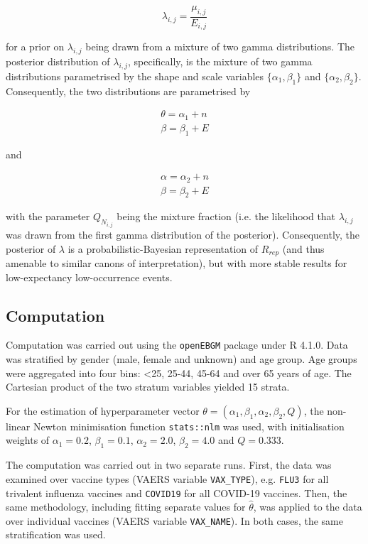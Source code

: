 \documentclass[preprints,communication,submit,oneauthor,pdftex]{Definitions/mdpi}
\begin{document}
$$ \lambda_{i,j} = \frac{\mu_{i,j}}{E_{i,j}}$$

\noindent for a prior on $\lambda_{i,j}$ being drawn from a mixture of two gamma distributions. The posterior distribution of $\lambda_{i,j}$, specifically, is the mixture of two gamma distributions parametrised by the shape and scale variables $\{\alpha_1, \beta_1\}$ and $\{\alpha_2, \beta_2\}$. Consequently, the two distributions are parametrised by

\begin{align*}
	\theta = \alpha_1 + n \\
	\beta = \beta_1 + E
\end{align*}

\noindent and 

\begin{align*}
	\alpha = \alpha_2 + n \\
	\beta = \beta_2 + E
\end{align*}

\noindent with the parameter $Q_{N_{i,j}}$ being the mixture fraction (i.e. the likelihood that $\lambda_{i,j}$ was drawn from the first gamma distribution of the posterior). Consequently, the posterior of $\lambda$ is a probabilistic-Bayesian representation of $R_{rep}$ (and thus amenable to similar canons of interpretation), but with more stable results for low-expectancy low-occurrence events.


\subsection{Computation} %
\label{sub:computation}

Computation was carried out using the \texttt{openEBGM}\cite{canida2017openebgm} package under R 4.1.0.\cite{rstats} Data was stratified by gender (male, female and unknown) and age group. Age groups were aggregated into four bins: <25, 25-44, 45-64 and over 65 years of age. The Cartesian product of the two stratum variables yielded 15 strata.

For the estimation of hyperparameter vector $\theta = (\alpha_1, \beta_1, \alpha_2, \beta_2, Q)$, the non-linear Newton minimisation function \texttt{stats::nlm} was used, with initialisation weights of $\alpha_1 = 0.2$, $\beta_1 = 0.1$, $\alpha_2 = 2.0$, $\beta_2 = 4.0$ and $Q = 0.333$. 

The computation was carried out in two separate runs. First, the data was examined over vaccine types (VAERS variable \texttt{VAX\_TYPE}), e.g. \texttt{FLU3} for all trivalent influenza vaccines and \texttt{COVID19} for all COVID-19 vaccines. Then, the same methodology, including fitting separate values for $\hat{\theta}$, was applied to the data over individual vaccines (VAERS variable \texttt{VAX\_NAME}). In both cases, the same stratification was used.
\end{document}
